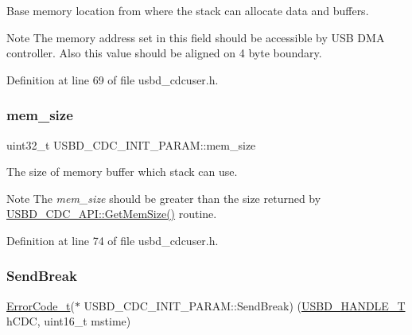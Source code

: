 Base memory location from where the stack can allocate data and buffers. \begin{DoxyNote}{Note}
The memory address set in this field should be accessible by U\+SB D\+MA controller. Also this value should be aligned on 4 byte boundary. 
\end{DoxyNote}


Definition at line 69 of file usbd\+\_\+cdcuser.\+h.

\mbox{\label{struct_u_s_b_d___c_d_c___i_n_i_t___p_a_r_a_m_a3616334a22f3ae9a30029f572920b9f4}} 
\subsubsection{\texorpdfstring{mem\+\_\+size}{mem\_size}}
{\footnotesize\ttfamily uint32\+\_\+t U\+S\+B\+D\+\_\+\+C\+D\+C\+\_\+\+I\+N\+I\+T\+\_\+\+P\+A\+R\+A\+M\+::mem\+\_\+size}

The size of memory buffer which stack can use. \begin{DoxyNote}{Note}
The {\itshape mem\+\_\+size} should be greater than the size returned by \hyperlink{struct_u_s_b_d___c_d_c___a_p_i_abde21c25f0b02b4d3ec9af0e41378437}{U\+S\+B\+D\+\_\+\+C\+D\+C\+\_\+\+A\+P\+I\+::\+Get\+Mem\+Size()} routine. 
\end{DoxyNote}


Definition at line 74 of file usbd\+\_\+cdcuser.\+h.

\mbox{\label{struct_u_s_b_d___c_d_c___i_n_i_t___p_a_r_a_m_a1ae8501d22f581ca8f756f068fb1c506}} 
\subsubsection{\texorpdfstring{Send\+Break}{SendBreak}}
{\footnotesize\ttfamily \hyperlink{error_8h_a905255056c349318139d94aa4523d516}{Error\+Code\+\_\+t}($\ast$ U\+S\+B\+D\+\_\+\+C\+D\+C\+\_\+\+I\+N\+I\+T\+\_\+\+P\+A\+R\+A\+M\+::\+Send\+Break) (\hyperlink{group___u_s_b_d___core_gafdbb2204d929cb9d75736bd2b42342ac}{U\+S\+B\+D\+\_\+\+H\+A\+N\+D\+L\+E\+\_\+T} h\+C\+DC, uint16\+\_\+t mstime)}

